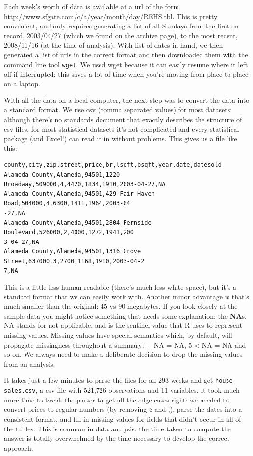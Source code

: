 \documentclass[oneside]{article}
\begin{document}
Each week's worth of data is available at a url of the form \url{http://www.sfgate.com/c/a/year/month/day/REHS.tbl}.  This is pretty convenient, and only requires generating a list of all Sundays from the first on record, 2003/04/27 (which we found on the archive page), to the most recent, 2008/11/16 (at the time of analysis).  With list of dates in hand, we then generated a list of urls in the correct format and then downloaded them with the command line tool {\tt wget}. We used wget because it can easily resume where it left off if interrupted: this saves a lot of time when you're moving from place to place on a laptop.

With all the data on a local computer, the next step was to convert the data into a standard format.  We use csv (comma separated values) for most datasets: although there's no standards document that exactly describes the structure of csv files, for most statistical datasets it's not complicated and every statistical package (and Excel!) can read it in without problems.   This gives us a file like this:

\begin{verbatim}
county,city,zip,street,price,br,lsqft,bsqft,year,date,datesold
Alameda County,Alameda,94501,1220 Broadway,509000,4,4420,1834,1910,2003-04-27,NA
Alameda County,Alameda,94501,429 Fair Haven Road,504000,4,6300,1411,1964,2003-04
-27,NA
Alameda County,Alameda,94501,2804 Fernside Boulevard,526000,2,4000,1272,1941,200
3-04-27,NA
Alameda County,Alameda,94501,1316 Grove Street,637000,3,2700,1168,1910,2003-04-2
7,NA
\end{verbatim}

This is a little less human readable (there's much less white space), but it's a standard format that we can easily work with.  Another minor advantage is that's much smaller than the original:  45 vs 90 megabytes.  If you look closely at the sample data you might notice something that needs some explanation: the {\bf NA}s.  NA stands for not applicable, and is the sentinel value that R uses to represent missing values.  Missing values have special semantics which, by default, will propagate missingness throughout a summary:  + NA = NA, 5 < NA = NA and so on. We always need to make a deliberate decision to drop the missing values from an analysis.

It takes just a few minutes to parse the files for all 293 weeks and get {\tt house-sales.csv}, a csv file with 521,726 observations and 11 variables.  It took much more time to tweak the parser to get all the edge cases right: we needed to convert prices to regular numbers (by removing \$ and ,), parse the dates into a consistent format, and fill in missing values for fields that didn't occur in all of the tables.  This is common in data analysis: the time taken to compute the answer is totally overwhelmed by the time necessary to develop the correct approach.
\end{document}
